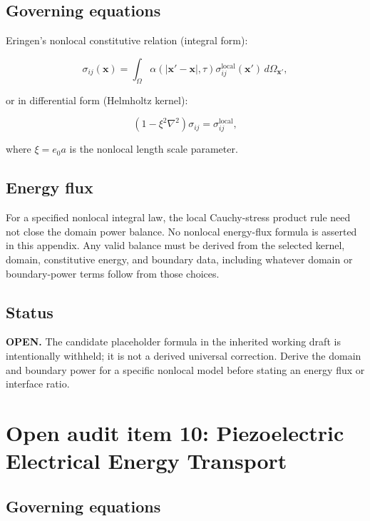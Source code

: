 \subsection{Governing equations}

Eringen's nonlocal constitutive relation (integral form):

\begin{equation}
\sigma_{ij}(\bm{x}) = \int_\Omega \alpha(|\bm{x}' - \bm{x}|, \tau) \sigma_{ij}^{\text{local}}(\bm{x}') \, d\Omega_{\bm{x}'},
\label{ef:nonlocal:1}
\end{equation}

or in differential form (Helmholtz kernel):

\begin{equation}
(1 - \xi^2\nabla^2)\sigma_{ij} = \sigma_{ij}^{\text{local}},
\label{ef:nonlocal:2}
\end{equation}

where $\xi = e_0 a$ is the nonlocal length scale parameter.

\subsection{Energy flux}

For a specified nonlocal integral law, the local Cauchy-stress product rule need not close the domain power balance. No nonlocal energy-flux formula is asserted in this appendix. Any valid balance must be derived from the selected kernel, domain, constitutive energy, and boundary data, including whatever domain or boundary-power terms follow from those choices.

\subsection{Status}

\textbf{OPEN.} The candidate placeholder formula in the inherited working draft is intentionally withheld; it is not a derived universal correction. Derive the domain and boundary power for a specific nonlocal model before stating an energy flux or interface ratio.

\section{Open audit item 10: Piezoelectric Electrical Energy Transport}

\subsection{Governing equations}

